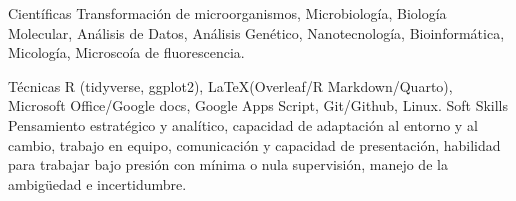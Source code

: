 

\begin{cvskills}

  \cvskill
    {Científicas} %
    {Transformación de microorganismos, Microbiología, Biología Molecular, Análisis de Datos, Análisis Genético, Nanotecnología, Bioinformática, Micología, Microscoía de fluorescencia.} %

  \cvskill
    {Técnicas} %
    {R (tidyverse, ggplot2), \textrm{\large \LaTeX}(Overleaf/R Markdown/Quarto), Microsoft Office/Google docs, Google Apps Script, Git/Github, Linux.} %
  \cvskill
    {Soft Skills} %
    {Pensamiento estratégico y analítico, capacidad de adaptación al entorno y al cambio, trabajo en equipo, comunicación y capacidad de presentación, habilidad para trabajar bajo presión con mínima o nula supervisión, manejo de la ambigüedad e incertidumbre.} %

\end{cvskills}
